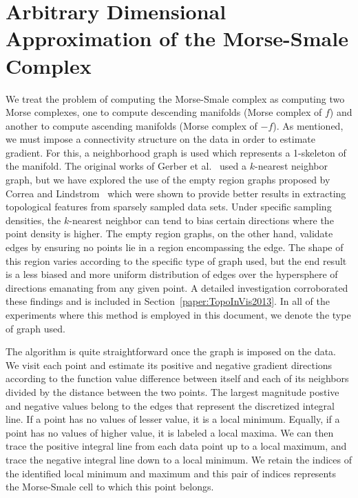 \section{Arbitrary Dimensional Approximation of the Morse-Smale Complex}
\label{sec:approximationMSC}

We treat the problem of computing the Morse-Smale complex as computing two Morse complexes, one to compute descending manifolds (Morse complex of $f$) and another to compute ascending manifolds (Morse complex of $-f$).
%
As mentioned, we must impose a connectivity structure on the data in order to estimate gradient.
%
For this, a neighborhood graph is used which represents a 1-skeleton of the manifold.
%
The original works of Gerber et al.~\cite{GerberBremerPascucci2010,GerberPotter2012,GerberRubelBremer2011} used a $k$-nearest neighbor graph, but we have explored the use of the empty region graphs proposed by Correa and Lindstrom~\cite{CorreaLindstrom2011} which were shown to provide better results in extracting topological features from sparsely sampled data sets.
%
Under specific sampling densities, the $k$-nearest neighbor can tend to bias certain directions where the point density is higher.
%
The empty region graphs, on the other hand, validate edges by ensuring no points lie in a region encompassing the edge.
%
The shape of this region varies according to the specific type of graph used, but the end result is a less biased and more uniform distribution of edges over the hypersphere of directions emanating from any given point.
%
A detailed investigation corroborated these findings and is included in
Section~\ref{paper:TopoInVis2013}.
%
In all of the experiments where this method is employed in this document, we denote the type of graph used.

The algorithm is quite straightforward once the graph is imposed on the data.
%
We visit each point and estimate its positive and negative gradient directions according to the function value difference between itself and each of its neighbors divided by the distance between the two points.
%
The largest magnitude postive and negative values belong to the edges that represent the discretized integral line.
%
If a point has no values of lesser value, it is a local minimum.
%
Equally, if a point has no values of higher value, it is labeled a local maxima.
%
We can then trace the positive integral line from each data point up to a local maximum, and trace the negative integral line down to a local minimum.
%
We retain the indices of the identified local minimum and maximum and this pair of indices represents the Morse-Smale cell to which this point belongs.


